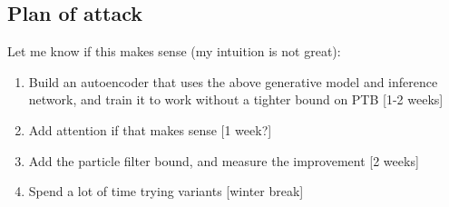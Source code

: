 \documentclass[12pt]{article}
\theoremstyle{definition}
\theoremstyle{remark}
\begin{document}
\subsection*{Plan of attack}
Let me know if this makes sense (my intuition is not great):

\begin{enumerate}
\item Build an autoencoder that uses the above generative model and inference network, and train it to work without a tighter bound on PTB [1-2 weeks]
\item Add attention if that makes sense [1 week?]
\item Add the particle filter bound, and measure the improvement [2 weeks]
\item Spend a lot of time trying variants [winter break]
\end{enumerate}


\end{document}
